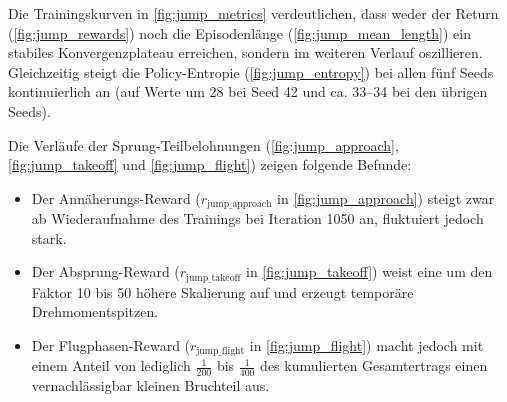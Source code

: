 Die Trainingskurven in \autoref{fig:jump_metrics} verdeutlichen, dass weder der Return (\autoref{fig:jump_rewards}) noch die Episodenlänge (\autoref{fig:jump_mean_length}) ein stabiles Konvergenzplateau erreichen, sondern im weiteren Verlauf oszillieren. Gleichzeitig steigt die Policy-Entropie (\autoref{fig:jump_entropy}) bei allen fünf Seeds kontinuierlich an (auf Werte um 28 bei Seed 42 und ca. 33--34 bei den übrigen Seeds).

Die Verläufe der Sprung-Teilbelohnungen (\autoref{fig:jump_approach}, \autoref{fig:jump_takeoff} und \autoref{fig:jump_flight}) zeigen folgende Befunde:
\begin{itemize}
	\item Der Annäherungs-Reward ($r_{\text{jump\_approach}}$ in \autoref{fig:jump_approach}) steigt zwar ab Wiederaufnahme des Trainings bei Iteration 1050 an, fluktuiert jedoch stark.
	\item Der Absprung-Reward ($r_{\text{jump\_takeoff}}$ in \autoref{fig:jump_takeoff}) weist eine um den Faktor 10 bis 50 höhere Skalierung auf und erzeugt temporäre Drehmomentspitzen.
	\item Der Flugphasen-Reward ($r_{\text{jump\_flight}}$ in \autoref{fig:jump_flight}) macht jedoch mit einem Anteil von lediglich $\frac{1}{200}$ bis $\frac{1}{400}$ des kumulierten Gesamtertrags einen vernachlässigbar kleinen Bruchteil aus.
\end{itemize}
